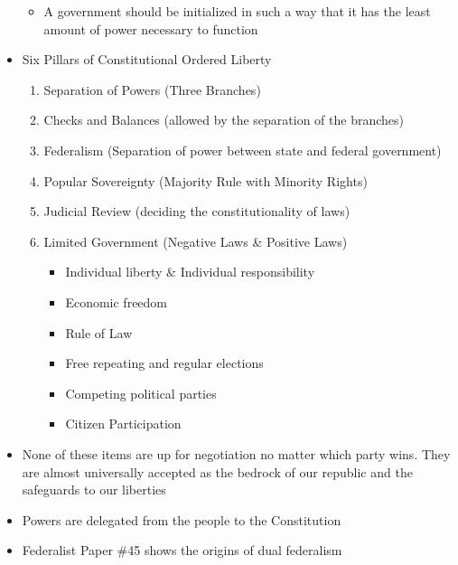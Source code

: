 \documentclass[12pt]{article}
\begin{document}
\begin{itemize}
\begin{itemize}
      \item A government should be initialized in such a way that it has the least amount of power necessary to function
        
    \end{itemize}

  \item Six Pillars of Constitutional Ordered Liberty

    \begin{enumerate}

      \item Separation of Powers (Three Branches)

      \item Checks and Balances (allowed by the separation of the branches)

      \item Federalism (Separation of power between state and federal government)

      \item Popular Sovereignty (Majority Rule with Minority Rights)
        
      \item Judicial Review (deciding the constitutionality of laws)

      \item Limited Government (Negative Laws \& Positive Laws)

        \begin{itemize}

          \item Individual liberty \& Individual responsibility

          \item Economic freedom

          \item Rule of Law

          \item Free repeating and regular elections

          \item Competing political parties

          \item Citizen Participation

        \end{itemize}

    \end{enumerate}

  \item None of these items are up for negotiation no matter which party wins. They are almost universally accepted as the bedrock of our republic and the safeguards to our liberties

  \item Powers are delegated from the people to the Constitution

  \item Federalist Paper \#45 shows the origins of dual federalism

\end{itemize}
\end{document}
